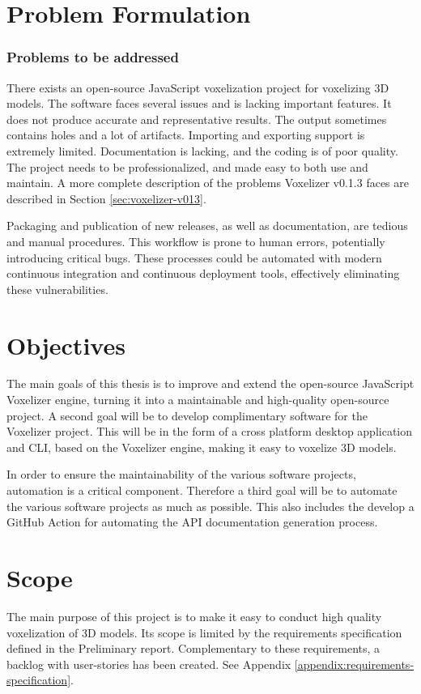 \section{Problem Formulation}

\subsubsection{Problems to be addressed}
There exists an open-source JavaScript voxelization project for voxelizing 3D models. The software faces several issues and is lacking important features. It does not produce accurate and representative results. The output sometimes contains holes and a lot of artifacts. Importing and exporting support is extremely limited. Documentation is lacking, and the coding is of poor quality. The project needs to be professionalized, and made easy to both use and maintain.
A more complete description of the problems Voxelizer v0.1.3 faces are described in Section \ref{sec:voxelizer-v013}.

Packaging and publication of new releases, as well as documentation, are tedious and manual procedures. This workflow is prone to human errors, potentially introducing critical bugs. These processes could be automated with modern continuous integration and continuous deployment tools, effectively eliminating these vulnerabilities.

\section{Objectives}
The main goals of this thesis is to improve and extend the open-source JavaScript Voxelizer engine, turning it into a maintainable and high-quality open-source project. A second goal will be to develop complimentary software for the Voxelizer project. This will be in the form of a cross platform desktop application and CLI, based on the Voxelizer engine, making it easy to voxelize 3D models.

In order to ensure the maintainability of the various software projects, automation is a critical component. Therefore a third goal will be to automate the various software projects as much as possible. This also includes the develop a GitHub Action for automating the API documentation generation process.

\section{Scope}
The main purpose of this project is to make it easy to conduct high quality voxelization of 3D models. Its scope is limited by the requirements specification defined in the Preliminary report. Complementary to these requirements, a backlog with user-stories has been created. See Appendix \ref{appendix:requirements-specification}.

